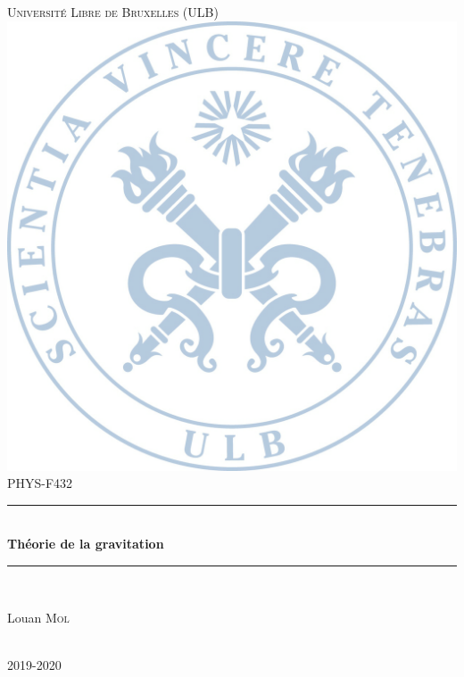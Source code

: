 \documentclass[a4paper,11pt]{report}
\theoremstyle{definition}
\theoremstyle{plain}
\theoremstyle{definition}
\theoremstyle{remark}
\newcommand{\HRule}{\rule{\linewidth}{0.5mm}}
\begin{document}
\begin{titlepage}

\center

\textsc{\LARGE Université Libre de Bruxelles (ULB)}\\[1.5cm] %
\includegraphics[scale=.1]{background.png}
\textsc{\large PHYS-F432}\\[0.5cm] %


\HRule \\[0.6cm]
{ \huge \bfseries Théorie de la gravitation}\\[0.4cm] %
\HRule \\[1.5cm]


\begin{minipage}{0.4\textwidth}
\begin{center} \large
Louan \textsc{Mol}
\end{center}

\end{minipage}\\[8cm]

{\large 2019-2020}\\[2cm] %

\vfill %

\end{titlepage}
\end{document}
